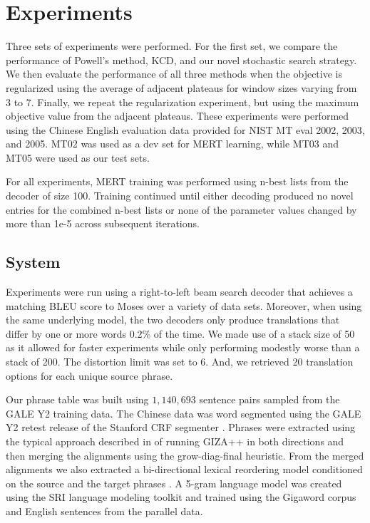 \documentclass[11pt]{article}
\begin{document}
\section{Experiments}

Three sets of experiments were performed. For the first set, we compare the performance of Powell's method, KCD, and our novel stochastic search strategy. We then evaluate the performance of all three methods when the objective is regularized using the average of adjacent plateaus for window sizes varying from 3 to 7. Finally, we repeat the regularization experiment, but using the maximum objective value from the adjacent plateaus. These experiments were performed using the Chinese English evaluation data provided for NIST MT eval 2002, 2003, and 2005. MT02 was used as a dev set for MERT learning, while MT03 and MT05 were used as our test sets. 

For all experiments, MERT training was performed using n-best lists from the decoder of size 100. Training continued until either decoding produced no novel entries for the combined n-best lists or none of the parameter values changed by more than 1e-5 across subsequent iterations.

\subsection{System}

Experiments were run using a right-to-left beam search decoder that achieves a matching BLEU score to Moses \cite{koehn2007} over a variety of data sets. Moreover, when using the same underlying model, the two decoders only produce translations that differ by one or more words 0.2\% of the time. We made use of a stack size of 50 as it allowed for faster experiments while only performing modestly worse than a stack of 200. The distortion limit was set to 6. And, we retrieved 20 translation options for each unique source phrase.

Our phrase table was built using \mbox{$1,140,693$} sentence pairs sampled from the GALE Y2 training data.  The Chinese data was word segmented using the GALE Y2 retest release of the Stanford CRF segmenter \cite{tseng05}.  Phrases were extracted using the typical approach described in  of running GIZA++ \cite{och03} in both directions and then merging the alignments using the grow-diag-final heuristic. From the merged alignments we also extracted a bi-directional lexical reordering model conditioned on the source and the target phrases \cite{tillmann04} \cite{koehn2007}. A 5-gram language model was created using the SRI language modeling toolkit \cite{stolcke02srilm} and trained using the Gigaword corpus and English sentences from the parallel data. 
\end{document}
